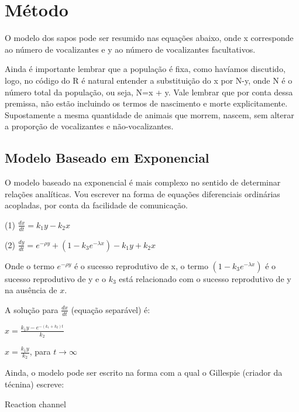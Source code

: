 \section{Método}\label{Metodo}
O modelo dos sapos pode ser resumido nas equações abaixo, onde x corresponde ao número de vocalizantes e y ao número de vocalizantes facultativos.

Ainda é importante lembrar que a população é fixa, como havíamos discutido, logo, no código do R é natural entender a substituição do x por N-y, onde N é o número total da população, ou seja, N=x + y. Vale lembrar que por conta dessa premissa, não estão incluindo os termos de nascimento e morte explicitamente. Supostamente a mesma quantidade de animais que morrem, nascem, sem alterar a proporção de vocalizantes e não-vocalizantes.

\subsection{Modelo Baseado em Exponencial}
O modelo baseado na exponencial é mais complexo no sentido de determinar relações analíticas. Vou escrever na forma de equações diferenciais ordinárias acopladas, por conta da facilidade de comunicação.

\vspace{3 mm}
(1) $\frac{dx}{dt} = k_1 y -k_2 x$

\vspace{3 mm}
(2) $\frac{dy}{dt}= e^{-\rho y} + (1-k_3 e^{-\lambda x}) -k_1 y +k_2 x$
\vspace{3 mm}

Onde o termo $e^{-\rho y}$ é o sucesso reprodutivo de x, o termo $(1-k_3 e^{-\lambda x})$ é o sucesso reprodutivo de y e o $k_3$ está relacionado com o sucesso reprodutivo de y na ausência de $x$.

A solução para $\frac{dx}{dt}$ (equação separável) é:

\vspace{3 mm}
$x=\frac{k_1 y - e^{-(k_1 + k_2)t}}{k_2}$
\vspace{3 mm}

\vspace{3 mm}
$x=\frac{k_1 y}{k_2}$, para $t \rightarrow \infty$
\vspace{3 mm}

Ainda, o modelo pode ser escrito na forma com a qual o Gillespie (criador da técnina) escreve:

\vspace{3 mm}
Reaction channel
\vspace{3 mm}

